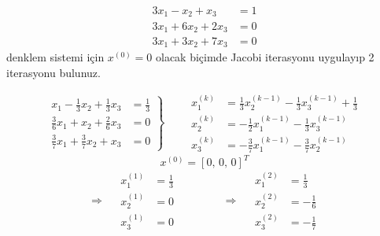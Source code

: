\documentclass[11pt,a4paper]{article}
\begin{document}
\begin{ornek}[3]
\[
  \begin{aligned}
    3x_1-x_2+x_3&=1\\
    3x_1+6x_2+2x_3&=0\\
    3x_1+3x_2+7x_3&=0
  \end{aligned}
\]
denklem sistemi için $x^{(0)}=0$ olacak biçimde Jacobi iterasyonu uygulayıp 2 iterasyonu bulunuz.
\end{ornek}
\[
  \left.\begin{aligned}
    x_1-\tfrac13x_2+\tfrac13x_3&=\tfrac13\\[1mm]
    \tfrac36x_1+x_2+\tfrac26x_3&=0\\[1mm]
    \tfrac37x_1+\tfrac37x_2+x_3&=0
  \end{aligned}\right\}
  \qquad
  \begin{aligned}
    x_1^{(k)}&=\tfrac13x_2^{(k-1)}-\tfrac13x_3^{(k-1)}+\tfrac13\\[1mm]
    x_2^{(k)}&=-\tfrac12x_1^{(k-1)}-\tfrac13x_3^{(k-1)}\\[1mm]
    x_3^{(k)}&=-\tfrac37x_1^{(k-1)}-\tfrac37x_2^{(k-1)}
  \end{aligned}
\]
\[ x^{(0)}=[0,\,0,\,0]^T \]
\[
  \Rightarrow\quad
  \begin{aligned}
    x_1^{(1)}&=\tfrac13\\ x_2^{(1)}&=0\\ x_3^{(1)}&=0
  \end{aligned}
  \qquad\qquad
  \Rightarrow\quad
  \begin{aligned}
    x_1^{(2)}&=\tfrac13\\ x_2^{(2)}&=-\tfrac16\\ x_3^{(2)}&=-\tfrac17
  \end{aligned}
\]
\end{document}
